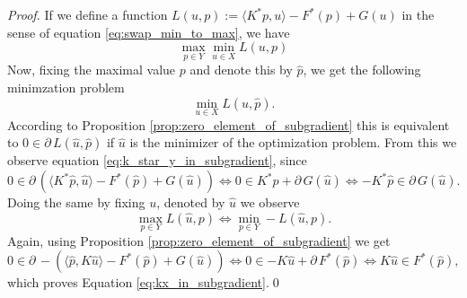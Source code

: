     \begin{proof}
        If we define a function $L(u, p) := \langle K^{\ast}p, u \rangle - F^{\ast}(p) + G(u)$ in the sense of equation \ref{eq:swap_min_to_max}, we have
            $$
                \max_{p \in Y} \min_{u \in X} L(u, p)
            $$
        Now, fixing the maximal value $p$ and denote this by $\hat{p}$, we get the following minimzation problem
            $$
                \min_{u \in X} L(u, \hat{p}).
            $$
        According to Proposition \ref{prop:zero_element_of_subgradient} this is equivalent to $0 \in \partial\,L(\hat{u}, \hat{p})$ if $\hat{u}$ is the minimizer of the optimization problem. From this we observe equation \ref{eq:k_star_y_in_subgradient}, since
            $$
                0 \in \partial \, (\langle K^{\ast}\hat{p}, \hat{u} \rangle - F^{\ast}(\hat{p}) + G(\hat{u})) \Longleftrightarrow 0 \in K^{\ast}\hat{p} + \partial \, G(\hat{u}) \Longleftrightarrow -K^{\ast}\hat{p} \in \partial \, G(\hat{u}).
            $$
        Doing the same by fixing $u$, denoted by $\hat{u}$ we observe
            $$
                \max_{p \in Y} L(\hat{u}, p) \Longleftrightarrow \min_{p \in Y} -L(\hat{u}, p).
            $$
        Again, using Proposition \ref{prop:zero_element_of_subgradient} we get
            $$
                0 \in \partial \, -(\langle \hat{p}, K\hat{u} \rangle - F^{\ast}(\hat{p}) + G(\hat{u})) \Longleftrightarrow 0 \in -K\hat{u} + \partial \, F^{\ast}(\hat{p}) \Longleftrightarrow K\hat{u} \in F^{\ast}(\hat{p}),
            $$
        which proves Equation \ref{eq:kx_in_subgradient}.\qed
    \end{proof}

